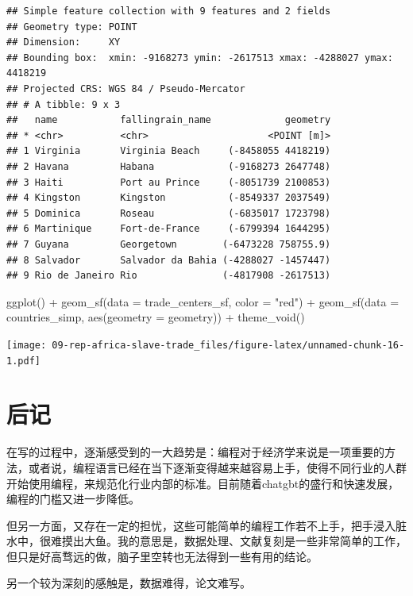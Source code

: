 \documentclass[
  oneside]{book}
\newenvironment{Shaded}{\begin{snugshade}}{\end{snugshade}}
\newcommand{\AttributeTok}[1]{\textcolor[rgb]{0.77,0.63,0.00}{#1}}
\newcommand{\FunctionTok}[1]{\textcolor[rgb]{0.00,0.00,0.00}{#1}}
\newcommand{\NormalTok}[1]{#1}
\newcommand{\SpecialCharTok}[1]{\textcolor[rgb]{0.00,0.00,0.00}{#1}}
\newcommand{\StringTok}[1]{\textcolor[rgb]{0.31,0.60,0.02}{#1}}
\begin{document}
\begin{verbatim}
## Simple feature collection with 9 features and 2 fields
## Geometry type: POINT
## Dimension:     XY
## Bounding box:  xmin: -9168273 ymin: -2617513 xmax: -4288027 ymax: 4418219
## Projected CRS: WGS 84 / Pseudo-Mercator
## # A tibble: 9 x 3
##   name           fallingrain_name             geometry
## * <chr>          <chr>                     <POINT [m]>
## 1 Virginia       Virginia Beach     (-8458055 4418219)
## 2 Havana         Habana             (-9168273 2647748)
## 3 Haiti          Port au Prince     (-8051739 2100853)
## 4 Kingston       Kingston           (-8549337 2037549)
## 5 Dominica       Roseau             (-6835017 1723798)
## 6 Martinique     Fort-de-France     (-6799394 1644295)
## 7 Guyana         Georgetown        (-6473228 758755.9)
## 8 Salvador       Salvador da Bahia (-4288027 -1457447)
## 9 Rio de Janeiro Rio               (-4817908 -2617513)
\end{verbatim}

\begin{Shaded}
\begin{Highlighting}[]
\FunctionTok{ggplot}\NormalTok{() }\SpecialCharTok{+}
  \FunctionTok{geom\_sf}\NormalTok{(}\AttributeTok{data =}\NormalTok{ trade\_centers\_sf, }\AttributeTok{color =} \StringTok{"red"}\NormalTok{) }\SpecialCharTok{+}
  \FunctionTok{geom\_sf}\NormalTok{(}\AttributeTok{data =}\NormalTok{ countries\_simp, }\FunctionTok{aes}\NormalTok{(}\AttributeTok{geometry =}\NormalTok{ geometry)) }\SpecialCharTok{+}
  \FunctionTok{theme\_void}\NormalTok{()}
\end{Highlighting}
\end{Shaded}

\texttt{[image: 09-rep-africa-slave-trade\_files/figure-latex/unnamed-chunk-16-1.pdf]}

\hypertarget{ux540eux8bb0}{%
\chapter{后记}\label{ux540eux8bb0}}

在写的过程中，逐渐感受到的一大趋势是：编程对于经济学来说是一项重要的方法，或者说，编程语言已经在当下逐渐变得越来越容易上手，使得不同行业的人群开始使用编程，来规范化行业内部的标准。目前随着chatgbt的盛行和快速发展，编程的门槛又进一步降低。

但另一方面，又存在一定的担忧，这些可能简单的编程工作若不上手，把手浸入脏水中，很难摸出大鱼。我的意思是，数据处理、文献复刻是一些非常简单的工作，但只是好高骛远的做，脑子里空转也无法得到一些有用的结论。

另一个较为深刻的感触是，数据难得，论文难写。

\printbibliography
\end{document}
